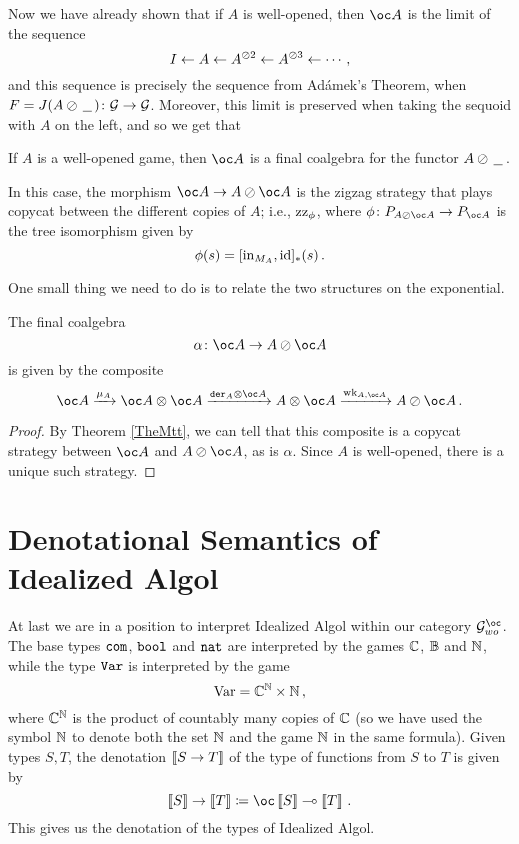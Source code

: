 Now we have already shown that if $A$ is well-opened, then $\oc A$ is the limit of the sequence
\[
  I \leftarrow A \leftarrow A^{\oslash 2} \leftarrow A^{\oslash 3} \leftarrow \cdots\,,
  \]
and this sequence is precisely the sequence from Ad{\'a}mek's Theorem, when $F=J(A\oslash\,\underline{\hspace{1.5ex}}\,) \colon \mathcal G \to \mathcal G$.
Moreover, this limit is preserved when taking the sequoid with $A$ on the left, and so we get that
\begin{corollary}
  If $A$ is a well-opened game, then $\oc A$ is a final coalgebra for the functor $A \oslash \,\underline{\hspace{1.5ex}}\,$.
\end{corollary}
In this case, the morphism $\oc A \to A \sequoid \oc A$ is the zigzag strategy that plays copycat between the different copies of $A$; i.e., $\operatorname{zz}_\phi$, where $\phi\from P_{A\sequoid \oc A} \to P_{\oc A}$ is the tree isomorphism given by
\[
  \phi(s) = [\operatorname{in}_{M_A},\operatorname{id}]_*(s)\,.
  \]

One small thing we need to do is to relate the two structures on the exponential.

\begin{proposition}
  The final coalgebra
  \[
    \alpha\from \oc A \to A \sequoid \oc A
    \]
  is given by the composite
  \[
    \oc A \xrightarrow{\mu_A} \oc A \tensor \oc A \xrightarrow{\der_A\tensor \oc A} A \tensor \oc A \xrightarrow{\wk_{A,\oc A}} A \sequoid \oc A\,.
    \]
  \label{PropFormulaForAlpha}
\end{proposition}
\begin{proof}
  By Theorem \ref{TheMtt}, we can tell that this composite is a copycat strategy between $\oc A$ and $A \sequoid \oc A$, as is $\alpha$.  
  Since $A$ is well-opened, there is a unique such strategy.
\end{proof}

\section{Denotational Semantics of Idealized Algol}

At last we are in a position to interpret Idealized Algol within our category $\G_{wo}^{\oc}$.  
The base types ${\mathtt{com}}$, ${\mathtt{bool}}$ and ${\mathtt{nat}}$ are interpreted by the games $\mathbb{C}$, $\mathbb{B}$ and $\mathbb{N}$, while the type ${\mathtt{Var}}$ is interpreted by the game
\[
  \operatorname{Var} = \mathbb{C}^{\mathbb{N}} \times \mathbb{N}\,,
  \]
where $\mathbb{C}^{\mathbb{N}}$ is the product of countably many copies of $\mathbb{C}$ (so we have used the symbol $\mathbb{N}$ to denote both the set $\mathbb{N}$ and the game $\mathbb{N}$ in the same formula).
Given types $S,T$, the denotation $\left\llbracket S\to T\right\rrbracket$ of the type of functions from $S$ to $T$ is given by
\[
  \deno{S}\to\deno{T} \coloneqq \oc\deno{S}\implies\deno{T}\,.
  \]
This gives us the denotation of the types of Idealized Algol.  

